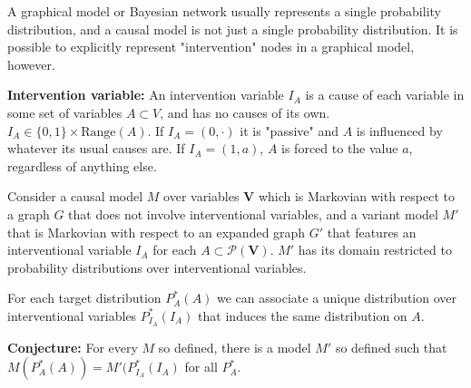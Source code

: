 A graphical model or Bayesian network usually represents a single probability distribution, and a causal model is not just a single probability distribution. It is possible to explicitly represent "intervention" nodes in a graphical model, however.

\textbf{Intervention variable:} An intervention variable $I_A$ is a cause of each variable in some set of variables $A\subset V$, and has no causes of its own. $I_A\in \{0,1\}\times \mathrm{Range}(A)$. If $I_A=(0,\cdot)$ it is "passive" and $A$ is influenced by whatever its usual causes are. If $I_A=(1,a)$, $A$ is forced to the value $a$, regardless of anything else.

Consider a causal model $M$ over variables $\mathbf{V}$ which is Markovian with respect to a graph $G$ that does not involve interventional variables, and a variant model $M'$ that is Markovian with respect to an expanded graph $G'$ that features an interventional variable $I_A$ for each $A\subset\mathscr{P}(\mathbf{V})$. $M'$ has its domain restricted to probability distributions over interventional variables.

For each target distribution $P^*_{A}(A)$ we can associate a unique distribution over interventional variables $P^*_{I_A}(I_A)$ that induces the same distribution on $A$.

\textbf{Conjecture:} For every $M$ so defined, there is a model $M'$ so defined such that $M(P^*_A(A))=M'(P^*_{I_A}(I_A)$ for all $P^*_A$.
